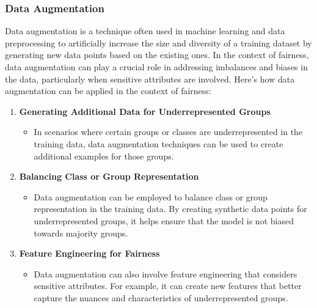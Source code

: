 \documentclass[12pt,a4paper,openright,twoside]{book}
\begin{document}
\subsubsection{Data Augmentation}

Data augmentation is a technique often used in machine learning and data preprocessing to artificially increase the size and diversity of a training dataset by generating new data points based on the existing ones. In the context of fairness, data augmentation can play a crucial role in addressing imbalances and biases in the data, particularly when sensitive attributes are involved. Here's how data augmentation can be applied in the context of fairness:

\begin{enumerate}

    \item \textbf{Generating Additional Data for Underrepresented Groups}
    
    \begin{itemize}

        \item In scenarios where certain groups or classes are underrepresented in the training data, data augmentation techniques can be used to create additional examples for those groups. \cite{sharma2020data}
    
    \end{itemize}
    
    \item \textbf{Balancing Class or Group Representation}
    
    \begin{itemize}
        
        \item Data augmentation can be employed to balance class or group representation in the training data. By creating synthetic data points for underrepresented groups, it helps ensure that the model is not biased towards majority groups.
    
    \end{itemize}
    
    \item \textbf{Feature Engineering for Fairness}
    
    \begin{itemize}
        
        \item Data augmentation can also involve feature engineering that considers sensitive attributes. For example, it can create new features that better capture the nuances and characteristics of underrepresented groups. \cite{10.14778/3461535.3463474}
    

\end{itemize}
\end{enumerate}
\end{document}
